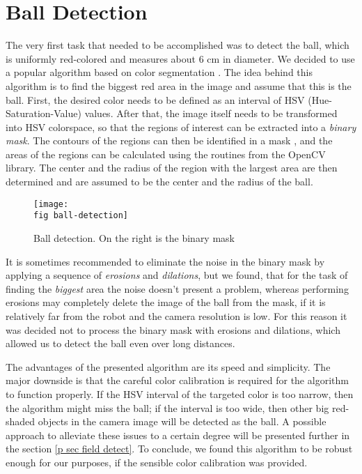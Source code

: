 \section{Ball Detection}
\label{p sec ball detection}

The very first task that needed to be accomplished was to detect the ball,
which is uniformly red-colored and measures about 6 cm in diameter. We decided
to use a popular algorithm based on color segmentation \cite{ball-detect}. The
idea behind this algorithm is to find the biggest red area in the image and
assume that this is the ball. First, the desired color needs to be defined as
an interval of HSV (Hue-Saturation-Value) \cite{hsv} values. After that, the
image itself needs to be transformed into HSV colorspace, so that the regions
of interest can be extracted into a \textit{binary mask}. The contours of the
regions can then be identified in a mask \cite{contours}, and the areas of the
regions can be calculated using the routines from the OpenCV library. The
center and the radius of the region with the largest area are then determined
and are assumed to be the center and the radius of the ball.

\begin{figure}[ht]
  \texttt{[image: \\fig ball-detection]}
  \caption{Ball detection. On the right is the binary mask}
  \label{p figure ball-detection}
\end{figure}

It is sometimes recommended \cite{ball-detect} to eliminate the noise in the
binary mask by applying a sequence of \textit{erosions} and \textit{dilations},
but we found, that for the task of finding the \textit{biggest} area the noise
doesn't present a problem, whereas performing erosions may completely delete
the image of the ball from the mask, if it is relatively far from the robot and
the camera resolution is low. For this reason it was decided not to process the
binary mask with erosions and dilations, which allowed us to detect the ball
even over long distances.

The advantages of the presented algorithm are its speed and simplicity. The
major downside is that the careful color calibration is required for the
algorithm to function properly. If the HSV interval of the targeted color is
too narrow, then the algorithm might miss the ball; if the interval is too
wide, then other big red-shaded objects in the camera image will be detected as
the ball. A possible approach to alleviate these issues to a certain degree
will be presented further in the section \ref{p sec field detect}. To
conclude, we found this algorithm to be robust enough for our purposes, if the
sensible color calibration was provided.

